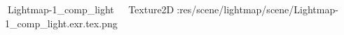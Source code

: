    Lightmap-1_comp_light            	   Texture2D   :   res/scene/lightmap/scene/Lightmap-1_comp_light.exr.tex.png
